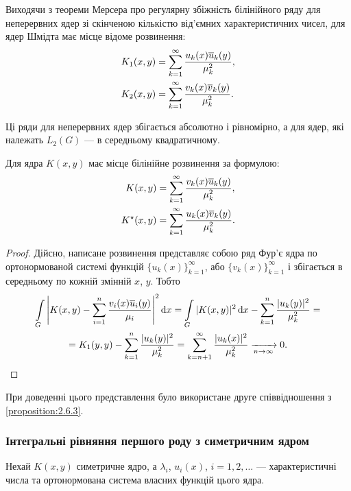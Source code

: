 Виходячи з теореми Мерсера про регулярну збіжність білінійного ряду для неперервних ядер зі скінченою кількістю від'ємних характеристичних чисел, для ядер Шмідта має місце відоме розвинення:
\begin{align}
	K_1(x,y)&=\displaystyle\sum\limits_{k=1}^\infty \dfrac{u_k(x)\overline u_k(y)}{\mu_k^2}, \\
	K_2(x,y)&=\displaystyle\sum\limits_{k=1}^\infty \dfrac{v_k(x)\overline v_k(y)}{\mu_k^2}.
\end{align}

Ці ряди для неперервних ядер збігається абсолютно і рівномірно, а для ядер, які належать $L_2(G)$ --- в середньому квадратичному.

\begin{proposition}
	\label{proposition:2.6.4}
	Для ядра $K(x,y)$ має місце білінійне розвинення за формулою:
	\begin{align}
		K(x,y)&=\displaystyle\sum\limits_{k=1}^\infty \dfrac{v_k(x)\overline u_k(y)}{\mu_k^2}, \\
		K^\star (x,y)&=\displaystyle\sum\limits_{k=1}^\infty \dfrac{u_k(x)\overline v_k(y)}{\mu_k^2}.
	\end{align}
\end{proposition}

\begin{proof}
	Дійсно, написане розвинення представляє собою ряд Фур'є ядра по ортонормованой системі функцій $\{u_k(x)\}_{k=1}^\infty$, або $\{v_k(x)\}_{k=1}^\infty$ і
	збігається в середньому по кожній змінній $x$, $y$. Тобто
	\begin{multline}
		\displaystyle\int\limits_G \left| K(x,y) - \displaystyle\sum\limits_{i=1}^n \dfrac{v_i(x) \overline u_i(y)}{\mu_i} \right|^2 \mathop{}\!\mathrm{d} x = \displaystyle\int\limits_G |K(x, y)|^2 \mathop{}\!\mathrm{d} x - \displaystyle\sum\limits_{k=1}^n \dfrac{|u_k(y)|^2}{\mu_k^2} = \\
		= K_1(y, y) - \displaystyle\sum\limits_{k=1}^n \dfrac{|u_k(y)|^2}{\mu_k^2} = \displaystyle\sum\limits_{k=n+1}^\infty \dfrac{|u_k(x)|^2}{\mu_k^2} \xrightarrow[n\to\infty]{} 0.
	\end{multline}
\end{proof}

\begin{remark}
	При доведенні цього представлення було використане друге співвідношення з \ref{proposition:2.6.3}.
\end{remark}

\subsubsection{Інтегральні рівняння першого роду з симетричним ядром}

Нехай $K(x, y)$ симетричне ядро, а $\lambda_i$, $u_i(x)$, $i=1,2,\ldots$ --- характеристичні числа та ортонормована система власних функцій цього ядра.

